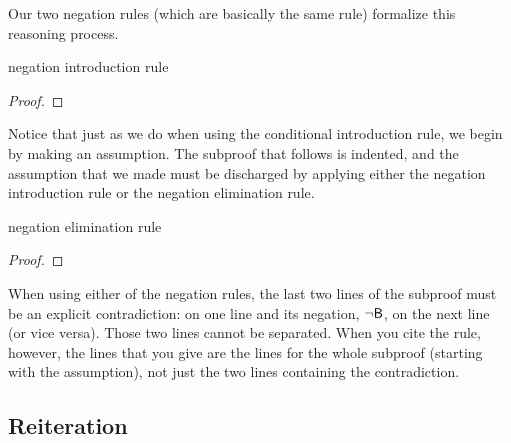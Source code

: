 Our two negation rules (which are basically the same rule) formalize this reasoning process.

\begin{factboxy}{negation introduction rule}
\begin{proof}
\open
	\as{}
\close
{}
\end{proof}
\end{factboxy}

\noindent Notice that just as we do when using the conditional introduction rule, we begin by making an assumption. The subproof that follows is indented, and the assumption that we made must be discharged by applying either the negation introduction rule or the negation elimination rule. 

\begin{factboxy}{negation elimination rule}
\begin{proof}
\open
	\as{}
\close
{}
\end{proof}
\end{factboxy}

When using either of the negation rules, the last two lines of the subproof must be an explicit contradiction:  on one line and its negation, ${\neg}\mathsf{B}$, on the next line (or vice versa). Those two lines cannot be separated. When you cite the rule, however, the lines that you give are the lines for the whole subproof (starting with the assumption), not just the two lines containing the contradiction. 



\subsection{Reiteration}

